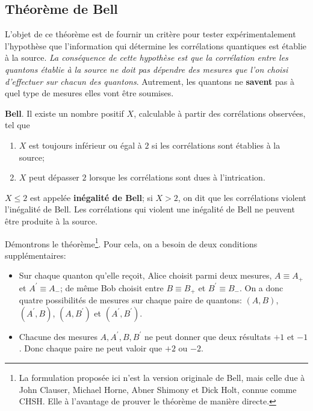 \subsection{Théorème de Bell}

L'objet de ce théorème est de fournir un critère pour tester expérimentalement
l'hypothèse que l'information qui détermine les corrélations quantiques est
établie à la source. \emph{La conséquence de cette hypothèse est que la
corrélation entre les quantons établie à la source ne doit pas dépendre des
mesures que l'on choisi d'effectuer sur chacun des quantons}. Autrement, les
quantons ne \textbf{savent} pas à quel type de mesures elles vont être soumises.

\medskip\colorbox[gray]{0.8}{
\parbox[c]{0.9\textwidth}{
\begin{theorem}
\textbf{Bell}. Il existe un nombre positif $X$, calculable à partir des
corrélations observées, tel que

\begin{enumerate}
\item $X$ est toujours inférieur ou égal à $2$ si les corrélations sont établies
à la source;

\item $X$ peut dépasser $2$ lorsque les corrélations sont dues à l'intrication.
\end{enumerate}

$X\leq2$ est appelée \textbf{inégalité de Bell}; si $X>2$, on dit que les
corrélations violent l'inégalité de Bell. Les corrélations qui violent une
inégalité de Bell ne peuvent être produite à la source.
\end{theorem}
}}

Démontrons le théorème\footnote{La formulation proposée ici n'est la version
originale de Bell, mais celle due à John Clauser, Michael Horne, Abner Shimony
et Dick Holt, connue comme CHSH. Elle à l'avantage de prouver le théorème de
manière directe.}. Pour cela, on a besoin de deux conditions supplémentaires:
\begin{itemize}
\item Sur chaque quanton qu'elle reçoit, Alice choisit parmi deux mesures,
$A\equiv A_{+}$ et $A^{\prime}\equiv A_{-}$; de même Bob choisit entre $B\equiv
B_{+}$ et $B^{\prime}\equiv B_{-}$. On a donc quatre possibilités de mesures sur
chaque paire de quantons: $(A,B)$, $(A^{\prime},B)$, $(A,B^{\prime})$ et
$(A^{\prime},B^{\prime})$.

\item Chacune des mesures $A,A^{\prime},B,B^{\prime}$ ne peut donner que deux
résultats $+1$ et $-1$. Donc chaque paire ne peut valoir que $+2$ ou $-2$.
\end{itemize}

